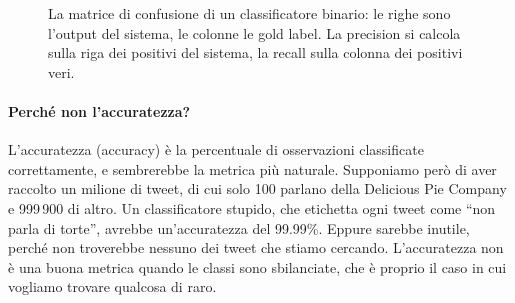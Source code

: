 \begin{figure}[htbp]
\centering
{}
\caption{La matrice di confusione di un classificatore binario: le righe sono l'output del sistema, le colonne le gold label. La precision si calcola sulla riga dei positivi del sistema, la recall sulla colonna dei positivi veri.}
\label{fig:confusion}
\end{figure}

\paragraph{Perché non l'accuratezza?} L'accuratezza (accuracy) è la percentuale di osservazioni classificate correttamente, e sembrerebbe la metrica più naturale. Supponiamo però di aver raccolto un milione di tweet, di cui solo 100 parlano della Delicious Pie Company e 999\,900 di altro. Un classificatore stupido, che etichetta ogni tweet come \enquote{non parla di torte}, avrebbe un'accuratezza del 99.99\%. Eppure sarebbe inutile, perché non troverebbe nessuno dei tweet che stiamo cercando. L'accuratezza non è una buona metrica quando le classi sono sbilanciate, che è proprio il caso in cui vogliamo trovare qualcosa di raro.

